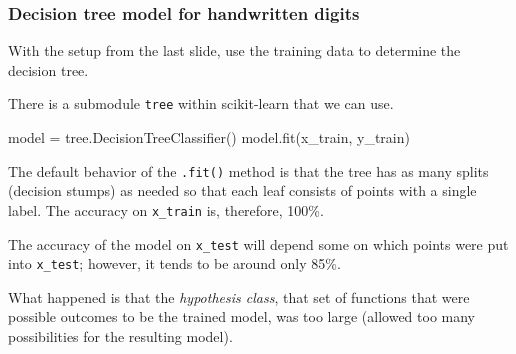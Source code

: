 \documentclass[smaller]{beamer}
\newenvironment{codeblock}
    {\hfill\begin{beamerboxesrounded}[lower=codecol, width=0.8\textwidth]
    \medskip

    }
    { 
    \end{beamerboxesrounded}\hfill
    }
\theoremstyle{example}
\newcommand{\ttt}[1]{{\small\texttt{#1}}}
\begin{document}
\begin{frame}[fragile]
    \frametitle{Decision tree model for handwritten digits}
With the setup from the last slide, use the training data to determine the decision tree.

There is a submodule \ttt{tree} within scikit-learn that we can use.

\begin{codeblock}

\begin{python}
model = tree.DecisionTreeClassifier()
model.fit(x_train, y_train)
\end{python}

\end{codeblock}

The default behavior of the \ttt{.fit()} method is that the tree has as many splits (decision stumps) as needed so that each leaf consists of points with a single label. The accuracy on \lstinline[language=Python,stringstyle=\ttfamily]{x_train} is, therefore, 100\%. 

The accuracy of the model on \lstinline[language=Python,basicstyle=\ttfamily]{x_test} will depend some on which points were put into \lstinline[language=Python,basicstyle=\ttfamily]{x_test}; however, it tends to be around only 85\%.

What happened is that the \textit{hypothesis class}, that set of functions that were possible outcomes to be the trained model, was too large (allowed too many possibilities for the resulting model). 
\end{frame}
\end{document}
